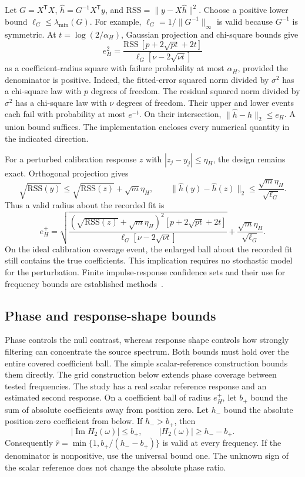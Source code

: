 Let $G=X^{\mathsf T}X$, $\widehat h=G^{-1}X^{\mathsf T}y$, and $\mathrm{RSS}=\|y-X\widehat h\|^2$. Choose a positive lower bound $\ell_G\le\lambda_{\min}(G)$. For example, $\ell_G=1/\|G^{-1}\|_\infty$ is valid because $G^{-1}$ is symmetric. At $t=\log(2/\alpha_H)$, Gaussian projection and chi-square bounds give
\begin{equation}
 e_H^2=\frac{\mathrm{RSS}\,[p+2\sqrt{pt}+2t]}
 {\ell_G[\nu-2\sqrt{\nu t}]}\label{cal16:radius}
\end{equation}
as a coefficient-radius square with failure probability at most $\alpha_H$, provided the denominator is positive. Indeed, the fitted-error squared norm divided by $\sigma^2$ has a chi-square law with $p$ degrees of freedom. The residual squared norm divided by $\sigma^2$ has a chi-square law with $\nu$ degrees of freedom. Their upper and lower events each fail with probability at most $e^{-t}$. On their intersection, $\|\widehat h-h\|_2\le e_H$. A union bound suffices. The implementation encloses every numerical quantity in the indicated direction.

For a perturbed calibration response $z$ with $|z_j-y_j|\le\eta_H$, the design remains exact. Orthogonal projection gives
\[
 \sqrt{\mathrm{RSS}(y)}\le\sqrt{\mathrm{RSS}(z)}+\sqrt m\eta_H,
 \qquad
 \|\widehat h(y)-\widehat h(z)\|_2\le\frac{\sqrt m\eta_H}{\sqrt{\ell_G}}.
\]
Thus a valid radius about the recorded fit is
\begin{equation}
 e_H^+=\sqrt{\frac{(\sqrt{\mathrm{RSS}(z)}+\sqrt m\eta_H)^2
 [p+2\sqrt{pt}+2t]}{\ell_G[\nu-2\sqrt{\nu t}]}}
 +\frac{\sqrt m\eta_H}{\sqrt{\ell_G}}.\label{cal16:rounded-radius}
\end{equation}
On the ideal calibration coverage event, the enlarged ball about the recorded fit still contains the true coefficients. This implication requires no stochastic model for the perturbation. Finite impulse-response confidence sets and their use for frequency bounds are established methods~\cite{weyerfir,csajisps,bomboisfrequency}.

\subsection{Phase and response-shape bounds}\label{cal16:phase-shape}
Phase controls the null contrast, whereas response shape controls how strongly filtering can concentrate the source spectrum. Both bounds must hold over the entire covered coefficient ball. The simple scalar-reference construction bounds them directly. The grid construction below extends phase coverage between tested frequencies.
The study has a real scalar reference response and an estimated second response. On a coefficient ball of radius $e_H^+$, let $b_+$ bound the sum of absolute coefficients away from position zero. Let $h_-$ bound the absolute position-zero coefficient from below. If $h_->b_+$, then
\[
 |\operatorname{Im}H_2(\omega)|\le b_+,\qquad
 |H_2(\omega)|\ge h_--b_+.
\]
Consequently $\widehat r=\min\{1,b_+/(h_--b_+)\}$ is valid at every frequency. If the denominator is nonpositive, use the universal bound one. The unknown sign of the scalar reference does not change the absolute phase ratio.

